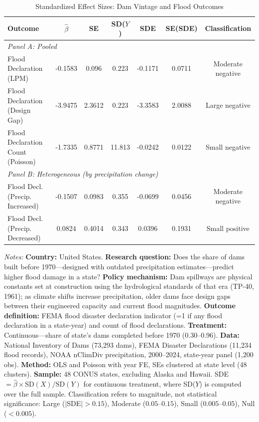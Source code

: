 \begin{table}[htbp]
\centering
\caption{Standardized Effect Sizes: Dam Vintage and Flood Outcomes}
\label{tab:sde}
\begin{threeparttable}
\footnotesize
\begin{tabular}{lcccccc}
\toprule
Outcome & $\hat{\beta}$ & SE & SD($Y$) & SDE & SE(SDE) & Classification \\
\midrule
\multicolumn{7}{l}{\textit{Panel A: Pooled}} \\
Flood Declaration (LPM) & -0.1583 & 0.096 & 0.223 & -0.1171 & 0.0711 & Moderate negative \\
Flood Declaration (Design Gap) & -3.9475 & 2.3612 & 0.223 & -3.3583 & 2.0088 & Large negative \\
Flood Declaration Count (Poisson) & -1.7335 & 0.8771 & 11.813 & -0.0242 & 0.0122 & Small negative \\
\midrule
\multicolumn{7}{l}{\textit{Panel B: Heterogeneous (by precipitation change)}} \\
Flood Decl. (Precip. Increased) & -0.1507 & 0.0983 & 0.355 & -0.0699 & 0.0456 & Moderate negative \\
Flood Decl. (Precip. Decreased) & 0.0824 & 0.4014 & 0.343 & 0.0396 & 0.1931 & Small positive \\
\bottomrule
\end{tabular}
\begin{tablenotes}[flushleft]
\item \small \textit{Notes:} \textbf{Country:} United States. \textbf{Research question:} Does the share of dams built before 1970---designed with outdated precipitation estimates---predict higher flood damage in a state? \textbf{Policy mechanism:} Dam spillways are physical constants set at construction using the hydrological standards of that era (TP-40, 1961); as climate shifts increase precipitation, older dams face design gaps between their engineered capacity and current flood magnitudes. \textbf{Outcome definition:} FEMA flood disaster declaration indicator (=1 if any flood declaration in a state-year) and count of flood declarations. \textbf{Treatment:} Continuous---share of state's dams completed before 1970 (0.30--0.96). \textbf{Data:} National Inventory of Dams (73,293 dams), FEMA Disaster Declarations (11,234 flood records), NOAA nClimDiv precipitation, 2000--2024, state-year panel (1,200 obs). \textbf{Method:} OLS and Poisson with year FE, SEs clustered at state level (48 clusters). \textbf{Sample:} 48 CONUS states, excluding Alaska and Hawaii. SDE $= \hat{\beta} \times \text{SD}(X) / \text{SD}(Y)$ for continuous treatment, where SD($Y$) is computed over the full sample. Classification refers to magnitude, not statistical significance: Large ($|$SDE$| > 0.15$), Moderate ($0.05$--$0.15$), Small ($0.005$--$0.05$), Null ($< 0.005$).
\end{tablenotes}
\end{threeparttable}
\end{table}
